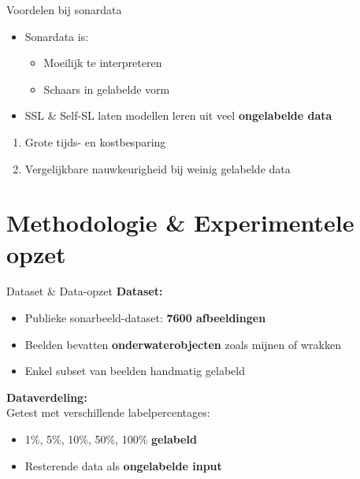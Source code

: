 \documentclass[aspectratio=169]{beamer}
\begin{document}
    \begin{frame}{Voordelen bij sonardata}
        \begin{itemize}
            \item Sonardata is:
            \begin{itemize}
                \item Moeilijk te interpreteren
                \item Schaars in gelabelde vorm
            \end{itemize}
            \item SSL \& Self-SL laten modellen leren uit veel \textbf{ongelabelde data}
        \end{itemize}
        \begin{enumerate}[$\Rightarrow$]
            \item Grote tijds- en kostbesparing
            \item Vergelijkbare nauwkeurigheid bij weinig gelabelde data
        \end{enumerate}
    \end{frame}
    
    \section{Methodologie \& Experimentele opzet}
    
    \begin{frame}{Dataset \& Data-opzet}
        \textbf{Dataset:}
        \begin{itemize}
            \item Publieke sonarbeeld-dataset: \textbf{7600 afbeeldingen}
            \item Beelden bevatten \textbf{onderwaterobjecten} zoals mijnen of wrakken
            \item Enkel subset van beelden handmatig gelabeld
        \end{itemize}
        \textbf{Dataverdeling:} \\
        Getest met verschillende labelpercentages:
        \begin{itemize}
            \item 1\%, 5\%, 10\%, 50\%, 100\% \textbf{gelabeld}
            \item Resterende data als \textbf{ongelabelde input}
        \end{itemize}
    \end{frame}
    
\end{document}
